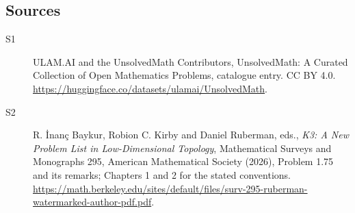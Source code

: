 \documentclass[11pt]{article}
\begin{document}
\subsection{Sources}
\begin{description}
\item[\hypertarget{source:statement:1}{S1}] ULAM.AI and the UnsolvedMath Contributors, UnsolvedMath: A Curated Collection of Open Mathematics Problems, catalogue entry. CC BY 4.0. \url{https://huggingface.co/datasets/ulamai/UnsolvedMath}.
\item[\hypertarget{source:statement:2}{S2}] R. İnanç Baykur, Robion C. Kirby and Daniel Ruberman, eds., \emph{K3: A New Problem List in Low-Dimensional Topology}, Mathematical Surveys and Monographs 295, American Mathematical Society (2026), Problem 1.75 and its remarks; Chapters 1 and 2 for the stated conventions. \url{https://math.berkeley.edu/sites/default/files/surv-295-ruberman-watermarked-author-pdf.pdf}.
\end{description}
\label{end:statement}
\end{document}
